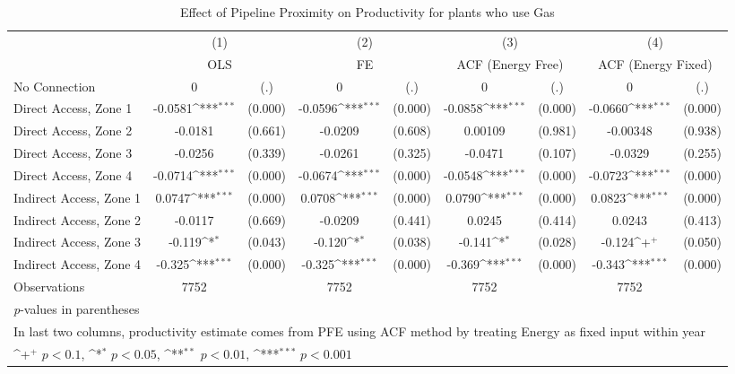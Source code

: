 \begin{table}[htbp]\centering
\def\sym#1{\ifmmode^{#1}\else\(^{#1}\)\fi}
\caption{Effect of Pipeline Proximity on Productivity for plants who use Gas}
\begin{tabular}{l*{4}{cc}}
\toprule
                    &\multicolumn{2}{c}{(1)}           &\multicolumn{2}{c}{(2)}           &\multicolumn{2}{c}{(3)}           &\multicolumn{2}{c}{(4)}           \\
                    &\multicolumn{2}{c}{OLS}           &\multicolumn{2}{c}{FE}            &\multicolumn{2}{c}{ACF (Energy Free)}&\multicolumn{2}{c}{ACF (Energy Fixed)}\\
\midrule
No Connection       &           0         &         (.)&           0         &         (.)&           0         &         (.)&           0         &         (.)\\
Direct Access, Zone 1&     -0.0581\sym{***}&     (0.000)&     -0.0596\sym{***}&     (0.000)&     -0.0858\sym{***}&     (0.000)&     -0.0660\sym{***}&     (0.000)\\
Direct Access, Zone 2&     -0.0181         &     (0.661)&     -0.0209         &     (0.608)&     0.00109         &     (0.981)&    -0.00348         &     (0.938)\\
Direct Access, Zone 3&     -0.0256         &     (0.339)&     -0.0261         &     (0.325)&     -0.0471         &     (0.107)&     -0.0329         &     (0.255)\\
Direct Access, Zone 4&     -0.0714\sym{***}&     (0.000)&     -0.0674\sym{***}&     (0.000)&     -0.0548\sym{***}&     (0.000)&     -0.0723\sym{***}&     (0.000)\\
Indirect Access, Zone 1&      0.0747\sym{***}&     (0.000)&      0.0708\sym{***}&     (0.000)&      0.0790\sym{***}&     (0.000)&      0.0823\sym{***}&     (0.000)\\
Indirect Access, Zone 2&     -0.0117         &     (0.669)&     -0.0209         &     (0.441)&      0.0245         &     (0.414)&      0.0243         &     (0.413)\\
Indirect Access, Zone 3&      -0.119\sym{*}  &     (0.043)&      -0.120\sym{*}  &     (0.038)&      -0.141\sym{*}  &     (0.028)&      -0.124\sym{+}  &     (0.050)\\
Indirect Access, Zone 4&      -0.325\sym{***}&     (0.000)&      -0.325\sym{***}&     (0.000)&      -0.369\sym{***}&     (0.000)&      -0.343\sym{***}&     (0.000)\\
\midrule
Observations        &        7752         &            &        7752         &            &        7752         &            &        7752         &            \\
\bottomrule
\multicolumn{9}{l}{\footnotesize \textit{p}-values in parentheses}\\
\multicolumn{9}{l}{\footnotesize In last two columns, productivity estimate comes from PFE using ACF method by treating Energy as fixed input within year}\\
\multicolumn{9}{l}{\footnotesize \sym{+} \(p<0.1\), \sym{*} \(p<0.05\), \sym{**} \(p<0.01\), \sym{***} \(p<0.001\)}\\
\end{tabular}
\end{table}
